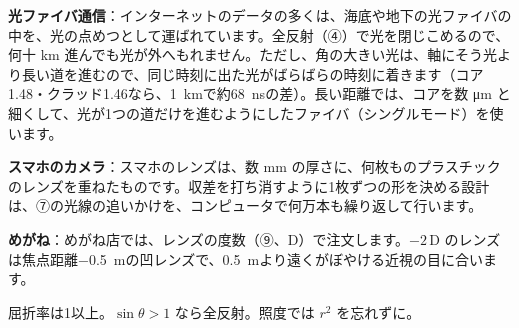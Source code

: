 \begin{phkougaku}
\textbf{光ファイバ通信}：インターネットのデータの多くは、海底や地下の光ファイバの中を、光の点めつとして運ばれています。全反射（④）で光を閉じこめるので、何十 km 進んでも光が外へもれません。ただし、角の大きい光は、軸にそう光より長い道を進むので、同じ時刻に出た光がばらばらの時刻に着きます（コア1.48・クラッド1.46なら、\qty{1}{km}で約\qty{68}{ns}の差）。長い距離では、コアを数 \si{\micro m} と細くして、光が1つの道だけを進むようにしたファイバ（シングルモード）を使います。

\textbf{スマホのカメラ}：スマホのレンズは、数 mm の厚さに、何枚ものプラスチックのレンズを重ねたものです。収差を打ち消すように1枚ずつの形を決める設計は、⑦の光線の追いかけを、コンピュータで何万本も繰り返して行います。

\textbf{めがね}：めがね店では、レンズの度数（⑨、D）で注文します。$-2$\,D のレンズは焦点距離\qty{-0.5}{m}の凹レンズで、\qty{0.5}{m}より遠くがぼやける近視の目に合います。

\begin{phketa}[光の数の目安]
屈折率は1以上。$\sin\theta>1$ なら全反射。照度では $r^2$ を忘れずに。
\end{phketa}
\end{phkougaku}




